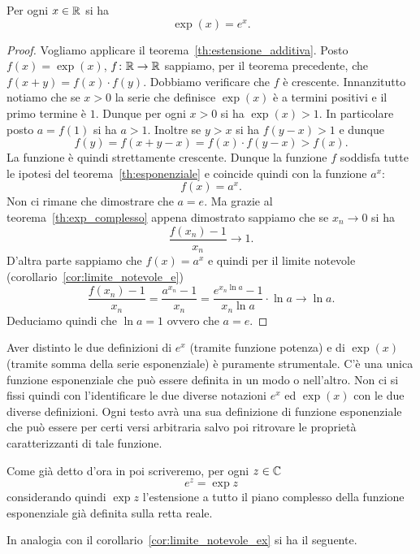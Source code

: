 \begin{theorem}%
\label{th:exp=ex}%
%
\mymark{***}%
Per ogni $x\in \mathbb R$ si ha
\[
  \exp(x) = e^x.
\]
\end{theorem}
%
\begin{proof}\mymark{**}
Vogliamo applicare il teorema~\ref{th:estensione_additiva}.
Posto $f(x)=\exp(x)$, $f\colon \mathbb R\to\mathbb R$ sappiamo,
per il teorema precedente, che $f(x+y)=f(x)\cdot f(y)$.
Dobbiamo verificare che $f$ è crescente.
Innanzitutto notiamo che se $x> 0$ la serie che definisce
$\exp(x)$ è a termini positivi e il primo termine è $1$.
Dunque per ogni $x> 0$ si ha $\exp(x)>1$.
In particolare posto $a=f(1)$ si ha $a>1$.
Inoltre se $y>x$ si ha $f(y-x)>1$ e dunque
\[
 f(y) = f(x+y-x) = f(x)\cdot f(y-x) > f(x).
\]
La funzione è quindi strettamente crescente.
Dunque la funzione $f$ soddisfa tutte le ipotesi
del teorema~\ref{th:esponenziale} e coincide
quindi con la funzione $a^x$:
\[
  f(x)= a^x.
\]
Non ci rimane che dimostrare che $a=e$.
Ma grazie al teorema~\ref{th:exp_complesso}
appena dimostrato sappiamo che se $x_n\to 0$ si ha
\[
  \frac{f(x_n)-1}{x_n}\to 1.
\]
D'altra parte sappiamo che $f(x)=a^x$ e quindi
per il limite notevole (corollario~\ref{cor:limite_notevole_e})
\[
\frac{f(x_n)-1}{x_n} = \frac{a^{x_n}-1}{x_n}
= \frac{e^{x_n \ln a}-1}{x_n \ln a} \cdot \ln a
\to \ln a.
\]
Deduciamo quindi che $\ln a= 1$ ovvero che $a=e$.
\end{proof}

Aver distinto le due definizioni di $e^x$ (tramite funzione potenza) e di $\exp(x)$ (tramite somma della serie esponenziale) è puramente strumentale.
C'è una unica funzione esponenziale che può essere definita in
un modo o nell'altro. Non ci si fissi quindi con l'identificare
le due diverse notazioni $e^x$ ed $\exp(x)$ con le due diverse definizioni.
Ogni testo avrà una sua definizione di funzione esponenziale che può
essere per certi versi arbitraria salvo poi ritrovare le proprietà
caratterizzanti di tale funzione.

Come già detto d'ora in poi scriveremo, per ogni $z\in \mathbb C$
\[
  e^z = \exp z
\]
considerando quindi $\exp z$ l'estensione a tutto il piano complesso
della funzione esponenziale già definita
sulla retta reale.

In analogia con il corollario~\ref{cor:limite_notevole_ex}
si ha il seguente.


